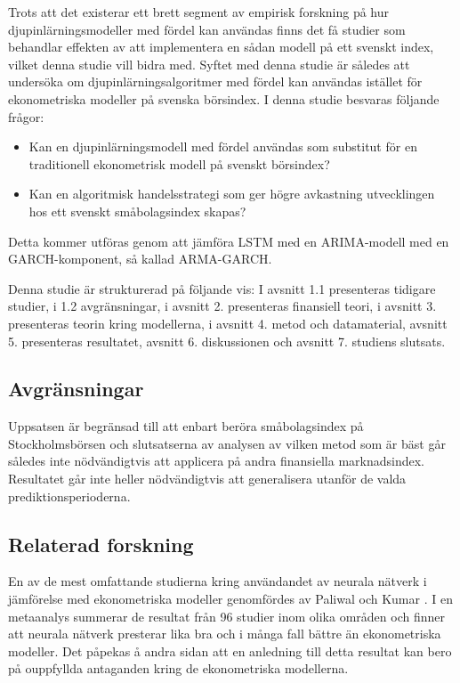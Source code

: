 \documentclass[11pt]{article}
\numberwithin{equation}{section}
\numberwithin{table}{section}
\numberwithin{figure}{section}
\begin{document}
Trots att det existerar ett brett segment av empirisk forskning på hur djupinlärningsmodeller med fördel kan användas finns det få studier som behandlar effekten av att implementera en sådan modell på ett svenskt index, vilket denna studie vill bidra med. Syftet med denna studie är således att undersöka om djupinlärningsalgoritmer med fördel kan användas istället för ekonometriska modeller på svenska börsindex. I denna studie besvaras följande frågor:

\begin{itemize}
    \item Kan en djupinlärningsmodell med fördel användas som substitut för en traditionell ekonometrisk modell på svenskt börsindex?
    \item Kan en algoritmisk handelsstrategi som ger högre avkastning utvecklingen hos ett svenskt småbolagsindex skapas?
\end{itemize}

Detta kommer utföras genom att jämföra LSTM med en ARIMA-modell med en GARCH-komponent, så kallad ARMA-GARCH. 

Denna studie är strukturerad på följande vis: I avsnitt 1.1 presenteras tidigare studier, i 1.2 avgränsningar, i avsnitt 2. presenteras finansiell teori, i avsnitt 3. presenteras teorin kring modellerna, i avsnitt 4. metod och datamaterial, avsnitt 5. presenteras resultatet, avsnitt 6. diskussionen och avsnitt 7. studiens slutsats.

\subsection{Avgränsningar}
Uppsatsen är begränsad till att enbart beröra småbolagsindex på Stockholmsbörsen och slutsatserna av analysen av vilken metod som är bäst går således inte nödvändigtvis att applicera på andra finansiella marknadsindex. Resultatet går inte heller nödvändigtvis att generalisera utanför de valda prediktionsperioderna.




\subsection{Relaterad forskning}

En av de mest omfattande studierna kring användandet av neurala nätverk i jämförelse med ekonometriska modeller genomfördes av Paliwal och Kumar \parencite*{paliwal2009neural}. I en metaanalys summerar de resultat från 96 studier inom olika områden och finner att neurala nätverk presterar lika bra och i många fall bättre än ekonometriska modeller. Det påpekas å andra sidan att en anledning till detta resultat kan bero på ouppfyllda antaganden kring de ekonometriska modellerna. 
\end{document}
